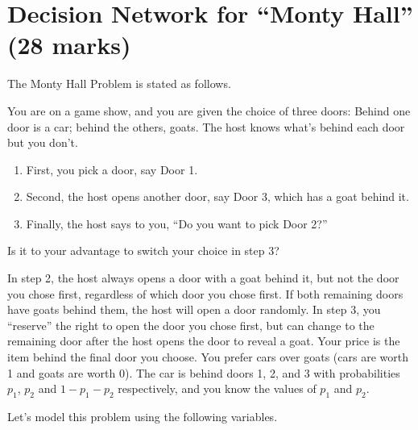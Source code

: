 \documentclass[12pt]{article}
\begin{document}
\newpage
\section{Decision Network for ``Monty Hall'' (28 marks)}

The Monty Hall Problem is stated as follows.

You are on a game show, and you are given the choice of three doors: Behind one door is a car; behind the others, goats. The host knows what's behind each door but you don't.

\begin{enumerate}

\item 
First, you pick a door, say Door 1.

\item 
Second, the host opens another door, say Door 3, which has a goat behind it.

\item 
Finally, the host says to you, ``Do you want to pick Door 2?'' 
\end{enumerate}

Is it to your advantage to switch your choice in step 3? 

In step 2, the host always opens a door with a goat behind it, but not the door you chose first, regardless of which door you chose first. If both remaining doors have goats behind them, the host will open a door randomly. In step 3, you ``reserve'' the right to open the door you chose first, but can change to the remaining door after the host opens the door to reveal a goat. Your price is the item behind the final door you choose. You prefer cars over goats (cars are worth 1 and goats are worth 0). The car is behind doors 1, 2, and 3 with probabilities $p_1$, $p_2$ and $1 - p_1 - p_2$ respectively, and you know the values of $p_1$ and $p_2$.

Let's model this problem using the following variables.
    
\end{document}
